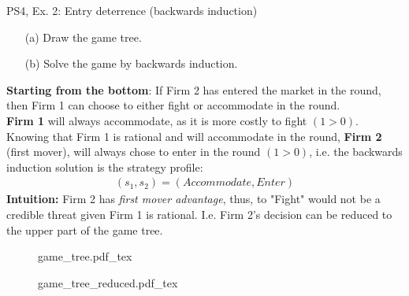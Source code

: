 \begin{frame}{PS4, Ex. 2: Entry deterrence (backwards induction)}
  \begin{multicols}{2}
    \begin{itemize}
      \item[(a)] Draw the game tree.
      \item[(b)] Solve the game by backwards induction.
    \end{itemize}
    \textbf{Starting from the bottom}: If Firm 2 has entered the market in the  round, then Firm 1 can choose to either fight or accommodate in the  round.\\\medskip
    \textbf{Firm 1} will always accommodate, as it is more costly to fight $(1>0)$.\\\medskip
    Knowing that Firm 1 is rational and will accommodate in the  round, \textbf{Firm 2} (first mover), will always chose to enter in the  round $(1>0)$, i.e. the backwards induction solution is the strategy profile:
      \begin{align*}
        (s_1,s_2)=(Accommodate,Enter)
      \end{align*}
    \textbf{Intuition:} Firm 2 has \textit{first mover advantage}, thus, to "Fight" would not be a credible threat given Firm 1 is rational. I.e. Firm 2's decision can be reduced to the upper part of the game tree.
  \vfill\null \columnbreak
    \begin{figure}[!h]
      \begin{center}
      \def\svgwidth{1.0\columnwidth}
      {game_tree.pdf_tex}
      \end{center}
    \end{figure}
    \begin{figure}[!h]
      \begin{center}
      \def\svgwidth{1.0\columnwidth}
      {game_tree_reduced.pdf_tex}
      \end{center}
    \end{figure}
  \vfill\null
  \end{multicols}
\end{frame}
